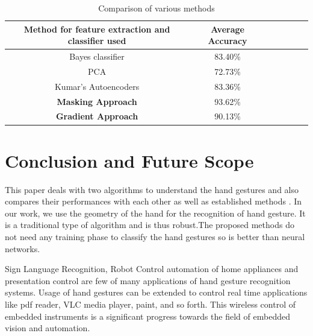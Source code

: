 \documentclass[conference]{IEEEtran}
\begin{document}
%
%
%

\begin{table}[h!]
\caption{Comparison of various methods}
\begin{center}
\begin{tabular}{|c|c|c|c|c|c|c|}
\hline
Method for feature extraction and classifier used & Average Accuracy \\ \hline
Bayes classifier \cite{Avraam2014StaticGR} & 83.40\% \\ \hline
PCA & 72.73\% \\ \hline
Kumar's Autoencoders \cite{kumar2014static} & 83.36\% \\ \hline
\textbf{Masking Approach} & 93.62\% \\ \hline
\textbf{Gradient Approach} & 90.13\% \\ \hline
\end{tabular}
\end{center}
\end{table}


\section{Conclusion and Future Scope}
This paper deals with two algorithms to understand the hand gestures and also compares their performances with each other as well as established methods \cite{khan2012hand}. In our work, we use the geometry of the hand for the recognition of hand gesture. It is a traditional type of algorithm and is thus robust.The proposed methods do not need any training phase \cite{7813732} to classify the hand gestures so is better than neural networks.

Sign Language Recognition, Robot Control automation of home appliances and presentation control are few of many applications of hand gesture recognition systems. Usage of hand gestures can be extended to control real time applications like pdf reader, VLC media player, paint, and so forth. This wireless control of embedded instruments is a significant progress towards the field of embedded vision and automation.

\end{document}
